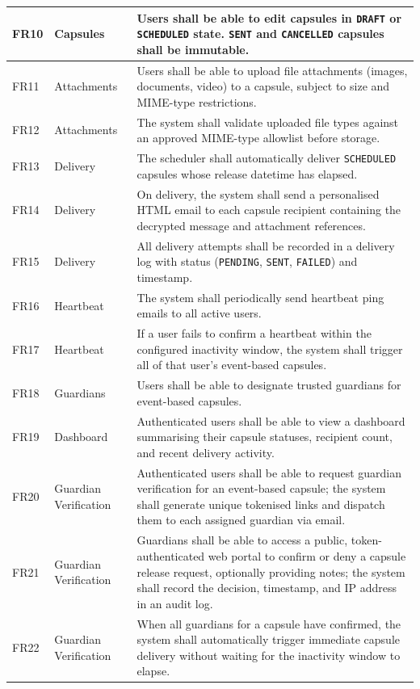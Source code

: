\documentclass[12pt, a4paper]{article}
\begin{document}
\begin{longtable}{|p{0.8cm}|p{3.5cm}|p{8.5cm}|}
\hline
FR10 & Capsules & Users shall be able to edit capsules in \texttt{DRAFT} or \texttt{SCHEDULED} state. \texttt{SENT} and \texttt{CANCELLED} capsules shall be immutable. \\
\hline
FR11 & Attachments & Users shall be able to upload file attachments (images, documents, video) to a capsule, subject to size and MIME-type restrictions. \\
\hline
FR12 & Attachments & The system shall validate uploaded file types against an approved MIME-type allowlist before storage. \\
\hline
FR13 & Delivery & The scheduler shall automatically deliver \texttt{SCHEDULED} capsules whose release datetime has elapsed. \\
\hline
FR14 & Delivery & On delivery, the system shall send a personalised HTML email to each capsule recipient containing the decrypted message and attachment references. \\
\hline
FR15 & Delivery & All delivery attempts shall be recorded in a delivery log with status (\texttt{PENDING}, \texttt{SENT}, \texttt{FAILED}) and timestamp. \\
\hline
FR16 & Heartbeat & The system shall periodically send heartbeat ping emails to all active users. \\
\hline
FR17 & Heartbeat & If a user fails to confirm a heartbeat within the configured inactivity window, the system shall trigger all of that user's event-based capsules. \\
\hline
FR18 & Guardians & Users shall be able to designate trusted guardians for event-based capsules. \\
\hline
FR19 & Dashboard & Authenticated users shall be able to view a dashboard summarising their capsule statuses, recipient count, and recent delivery activity. \\
\hline
FR20 & Guardian Verification & Authenticated users shall be able to request guardian verification for an event-based capsule; the system shall generate unique tokenised links and dispatch them to each assigned guardian via email. \\
\hline
FR21 & Guardian Verification & Guardians shall be able to access a public, token-authenticated web portal to confirm or deny a capsule release request, optionally providing notes; the system shall record the decision, timestamp, and IP address in an audit log. \\
\hline
FR22 & Guardian Verification & When all guardians for a capsule have confirmed, the system shall automatically trigger immediate capsule delivery without waiting for the inactivity window to elapse. \\

\end{longtable}
\end{document}
